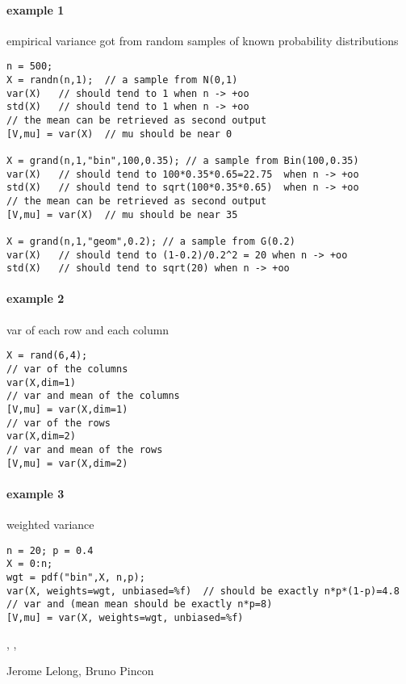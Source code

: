 \begin{examples}
\paragraph{example 1} empirical variance got from random samples of known probability distributions 
\begin{Verbatim}
n = 500;
X = randn(n,1);  // a sample from N(0,1)
var(X)   // should tend to 1 when n -> +oo
std(X)   // should tend to 1 when n -> +oo
// the mean can be retrieved as second output
[V,mu] = var(X)  // mu should be near 0

X = grand(n,1,"bin",100,0.35); // a sample from Bin(100,0.35)
var(X)   // should tend to 100*0.35*0.65=22.75  when n -> +oo
std(X)   // should tend to sqrt(100*0.35*0.65)  when n -> +oo
// the mean can be retrieved as second output
[V,mu] = var(X)  // mu should be near 35

X = grand(n,1,"geom",0.2); // a sample from G(0.2)
var(X)   // should tend to (1-0.2)/0.2^2 = 20 when n -> +oo
std(X)   // should tend to sqrt(20) when n -> +oo
\end{Verbatim}

\paragraph{example 2} var of each row and each column
\begin{Verbatim}
X = rand(6,4);
// var of the columns
var(X,dim=1)
// var and mean of the columns
[V,mu] = var(X,dim=1)
// var of the rows
var(X,dim=2)
// var and mean of the rows
[V,mu] = var(X,dim=2)
\end{Verbatim}

\paragraph{example 3} weighted variance
\begin{Verbatim}
n = 20; p = 0.4
X = 0:n;
wgt = pdf("bin",X, n,p);
var(X, weights=wgt, unbiased=%f)  // should be exactly n*p*(1-p)=4.8
// var and (mean mean should be exactly n*p=8)
[V,mu] = var(X, weights=wgt, unbiased=%f) 
\end{Verbatim}


\end{examples}

\begin{manseealso}
  , , 
\end{manseealso}

\begin{authors}
  Jerome Lelong, Bruno Pincon
\end{authors}

